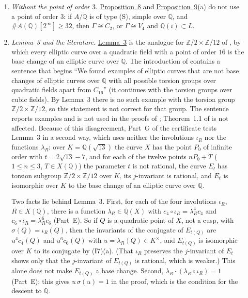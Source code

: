 \documentclass[11pt]{article}
\newcommand{\Q}{\mathbb Q}
\newcommand{\Z}{\mathbb Z}
\begin{document}
\begin{enumerate}
\item\label{rem-two} \emph{Without the point of order \(3\).} \hyperref[prop-rot]{Proposition~8} and
\hyperref[prop-v4]{Proposition~9}(a) do not use a point of order \(3\): if \(A/\Q\) is of type (S), simple over
\(\Q\), and \(\#A(\Q)[2^\infty]\ge32\), then \(\Gamma\cong C_2\), or \(\Gamma\cong V_4\) and \(\Q(i)\subset L\).

\item\label{rem-bn} \emph{Lemma~3 and the literature.} \hyperref[lemma-basechange]{Lemma~3} is the analogue for
\(\Z/2\times\Z/12\) of \cite[Theorem~1.1]{BN}, by which every elliptic curve over a quadratic field with a point of
order \(16\) is the base change of an elliptic curve over \(\Q\). The introduction of \cite{BN} contains a
sentence that begins ``We found examples of elliptic curves that are not base changes of elliptic curves over
\(\Q\) with all possible torsion groups over quadratic fields apart from \(C_{16}\)'' (it continues with the
torsion groups over cubic fields). By Lemma~3 there is no such example with the torsion group
\(\Z/2\times\Z/12\), so this statement is not correct for that group. The sentence reports examples and is not
used in the proofs of \cite{BN}; Theorem~1.1 of \cite{BN} is not affected. Because of this
disagreement, Part~G of the certificate tests Lemma~3 in a second way, which uses neither the involutions
\(\iota_R\) nor the functions \(\lambda_R\): over \(K=\Q(\sqrt{13})\) the curve \(X\) has the point \(P_0\) of
infinite order with \(t=2\sqrt{13}-7\), and for each of the twelve points \(nP_0+T\) (\(1\le n\le3\),
\(T\in X(\Q)\)) the parameter \(t\) is not rational, the curve \(E_t\) has torsion subgroup \(\Z/2\times\Z/12\)
over \(K\), its \(j\)-invariant is rational, and \(E_t\) is isomorphic over \(K\) to the base change of an
elliptic curve over \(\Q\).

Two facts lie behind Lemma~3. First, for each of the four involutions \(\iota_R\), \(R\in X(\Q)\), there is a
function \(\lambda_R\in\Q(X)\) with \(c_4\circ\iota_R=\lambda_R^4c_4\) and \(c_6\circ\iota_R=\lambda_R^6c_6\)
(Part~E). So if \(Q\) is a quadratic point of \(X\), not a cusp, with \(\sigma(Q)=\iota_R(Q)\), then the
invariants of the conjugate of \(E_{t(Q)}\) are \(u^4c_4(Q)\) and \(u^6c_6(Q)\) with \(u=\lambda_R(Q)\in K^\times\),
and \(E_{t(Q)}\) is isomorphic over \(K\) to its conjugate by (I7)(a). (That \(\iota_R\) preserves the
\(j\)-invariant of \(E_t\) shows only that the \(j\)-invariant of \(E_{t(Q)}\) is rational, which is weaker.) This
alone does not make \(E_{t(Q)}\) a base change. Second,
\(\lambda_R\cdot(\lambda_R\circ\iota_R)=1\) (Part~E); this gives \(u\,\sigma(u)=1\) in the proof, which is the
condition for the descent to \(\Q\).


\end{enumerate}
\end{document}
